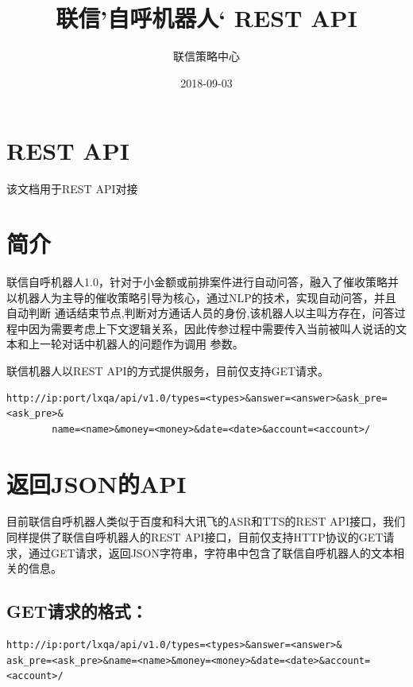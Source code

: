 \documentclass[]{book}
\title{联信'自呼机器人` REST API}
\author{联信策略中心}
\date{2018-09-03}
\begin{document}
\maketitle

{
\setcounter{tocdepth}{1}
\tableofcontents
}
\chapter*{REST API}\label{rest-api}

该文档用于REST API对接

\chapter{简介}\label{intro}

联信自呼机器人1.0，针对于小金额或前排案件进行自动问答，融入了催收策略并以机器人为主导的催收策略引导为核心，通过NLP的技术，实现自动问答，并且自动判断
通话结束节点,判断对方通话人员的身份,该机器人以主叫方存在，问答过程中因为需要考虑上下文逻辑关系，因此传参过程中需要传入当前被叫人说话的文本和上一轮对话中机器人的问题作为调用
参数。

联信机器人以REST API的方式提供服务，目前仅支持GET请求。

\begin{verbatim}
http://ip:port/lxqa/api/v1.0/types=<types>&answer=<answer>&ask_pre=<ask_pre>&
        name=<name>&money=<money>&date=<date>&account=<account>/
\end{verbatim}

\chapter{返回JSON的API}\label{json-api}

目前联信自呼机器人类似于百度和科大讯飞的ASR和TTS的REST
API接口，我们同样提供了联信自呼机器人的REST
API接口，目前仅支持HTTP协议的GET请求，通过GET请求，返回JSON字符串，字符串中包含了联信自呼机器人的文本相关的信息。

\section{\texorpdfstring{\textbf{GET请求的格式：}}{GET请求的格式：}}\label{get}

\begin{verbatim}
http://ip:port/lxqa/api/v1.0/types=<types>&answer=<answer>&
ask_pre=<ask_pre>&name=<name>&money=<money>&date=<date>&account=<account>/
\end{verbatim}
\end{document}

